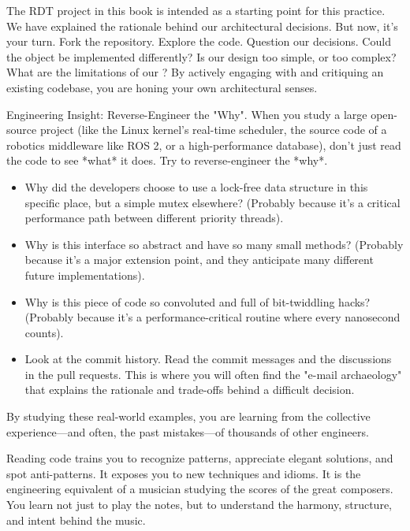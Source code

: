 The RDT project in this book is intended as a starting point for this practice. We have explained the rationale behind our architectural decisions. But now, it's your turn. Fork the repository. Explore the code. Question our decisions. Could the  object be implemented differently? Is our  design too simple, or too complex? What are the limitations of our ? By actively engaging with and critiquing an existing codebase, you are honing your own architectural senses.

\begin{tipbox}{Engineering Insight: Reverse-Engineer the "Why".}
    When you study a large open-source project (like the Linux kernel's real-time scheduler, the source code of a robotics middleware like ROS 2, or a high-performance database), don't just read the code to see *what* it does. Try to reverse-engineer the *why*.
    \begin{itemize}
        \item Why did the developers choose to use a lock-free data structure in this specific place, but a simple mutex elsewhere? (Probably because it's a critical performance path between different priority threads).
        \item Why is this interface so abstract and have so many small methods? (Probably because it's a major extension point, and they anticipate many different future implementations).
        \item Why is this piece of code so convoluted and full of bit-twiddling hacks? (Probably because it's a performance-critical routine where every nanosecond counts).
        \item Look at the commit history. Read the commit messages and the discussions in the pull requests. This is where you will often find the "e-mail archaeology" that explains the rationale and trade-offs behind a difficult decision.
    \end{itemize}
    By studying these real-world examples, you are learning from the collective experience—and often, the past mistakes—of thousands of other engineers.
\end{tipbox}

Reading code trains you to recognize patterns, appreciate elegant solutions, and spot anti-patterns. It exposes you to new techniques and idioms. It is the engineering equivalent of a musician studying the scores of the great composers. You learn not just to play the notes, but to understand the harmony, structure, and intent behind the music.

